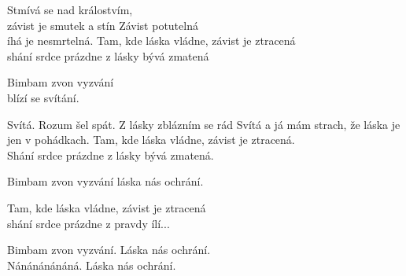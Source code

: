 
\ve{}
Stmívá se nad králostvím,\\
závist je smutek a stín 
Závist potutelná \\
íhá je nesmrtelná.
Tam, kde láska vládne, závist je ztracená\\
shání srdce prázdne z lásky bývá zmatená

\cho{}
Bimbam zvon vyzvání\\
blízí se svítání.

\ve{}
Svítá. Rozum šel spát.
 Z lásky zblázním se rád
Svítá a já mám strach,  
 že láska je jen v pohádkach.
Tam, kde láska vládne, závist je ztracená.\\
Shání srdce prázdne z lásky bývá zmatená.
 
\cho{}
Bimbam zvon vyzvání láska nás ochrání.

\re{}
Tam, kde láska vládne, závist je ztracená\\
shání srdce prázdne z pravdy ílí...

\cho{}
Bimbam zvon vyzvání. Láska nás ochrání. \\
Nánánánánáná. Láska nás ochrání.

\esong